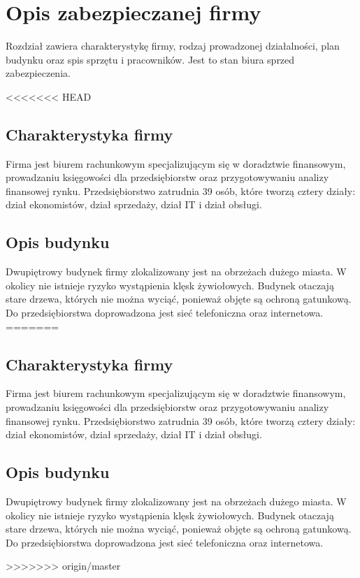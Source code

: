 \newpage\section{Opis zabezpieczanej firmy}
Rozdział zawiera charakterystykę firmy, rodzaj prowadzonej działalności, plan budynku oraz spis sprzętu i pracowników. Jest to stan biura sprzed zabezpieczenia.

<<<<<<< HEAD
\subsection*{Charakterystyka firmy}
Firma jest biurem rachunkowym specjalizującym się w doradztwie \linebreak finansowym, prowadzaniu księgowości dla przedsiębiorstw oraz przygotowywaniu analizy finansowej rynku. Przedsiębiorstwo zatrudnia 39 osób, które tworzą cztery działy: dział ekonomistów, dział sprzedaży, dział IT i dział obsługi.

\subsection{Opis budynku}
Dwupiętrowy budynek firmy zlokalizowany jest na obrzeżach dużego miasta. W okolicy nie istnieje ryzyko wystąpienia klęsk żywiołowych. \linebreak Budynek otaczają stare drzewa, których nie można wyciąć, ponieważ \linebreak objęte są ochroną gatunkową. Do przedsiębiorstwa doprowadzona jest sieć \linebreak telefoniczna oraz internetowa.
=======
\subsection{Charakterystyka firmy}
Firma jest biurem rachunkowym specjalizującym się w doradztwie finansowym, prowadzaniu księgowości dla przedsiębiorstw oraz przygotowywaniu analizy finansowej rynku. Przedsiębiorstwo zatrudnia 39 osób, które tworzą cztery działy: dział ekonomistów, dział sprzedaży, dział IT i dział obsługi.

\subsection{Opis budynku}
Dwupiętrowy budynek firmy zlokalizowany jest na obrzeżach dużego miasta. W okolicy nie istnieje ryzyko wystąpienia klęsk żywiołowych. Budynek otaczają stare drzewa, których nie można wyciąć, ponieważ objęte są ochroną gatunkową. Do przedsiębiorstwa doprowadzona jest sieć telefoniczna oraz internetowa.

>>>>>>> origin/master
